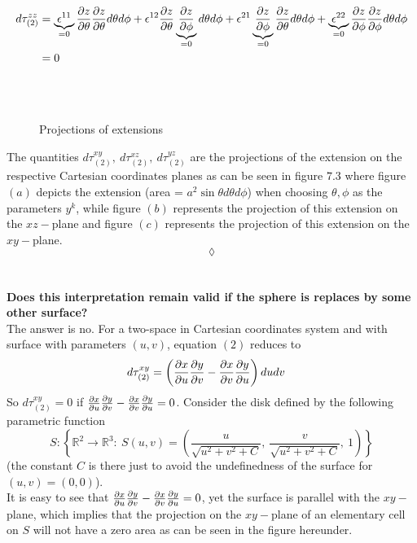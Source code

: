 \begin{align}
d\tau_{(2)}^{zz}&= \underbrace{\epsilon^{11}}_{=0}\pdv{z}{\theta}\pdv{z}{\theta}d{\theta}d{\phi}+\epsilon^{12}\pdv{z}{\theta}\underbrace{\pdv{z}{\phi}}_{=0}d{\theta}d{\phi}+\epsilon^{21}\underbrace{\pdv{z}{\phi}}_{=0}\pdv{z}{\theta}d{\theta}d{\phi}+\underbrace{\epsilon^{22}}_{=0}\pdv{z}{\phi}\pdv{z}{\phi}d{\theta}d{\phi}\\
&=0
\end{align}
\begin{figure}[H]%
    \centering
    \subfloat[]{}\\
    \subfloat[]{}\\
    \subfloat[]{}
\caption{Projections of extensions}
\label{fig:fig_p257}
\end{figure}
The quantities $d\tau_{(2)}^{xy},\ d\tau_{(2)}^{xz},  \ d\tau_{(2)}^{yz}$ are the projections of the extension on the respective Cartesian coordinates planes as can be seen in figure $7.3$ where figure $(a)$ depicts the extension (area = $a^2\sin{\theta}d\theta d\phi$) when choosing $\theta,\phi$ as the parameters $y^k$, while figure $(b)$ represents the projection of this extension on the $xz-$plane and figure $(c)$ represents the projection of this extension on the $xy-$plane.$$\lozenge$$ \\\\
\textbf{Does this interpretation remain valid if the sphere is replaces by some other surface?}
\\
The answer is no. For a two-space in Cartesian coordinates system  and with surface with parameters $(u,v)$, equation $(2)$ reduces to 
\begin{align}
d\tau_{(2)}^{xy}&= \left(\pdv{x}{u}\pdv{y}{v}-\pdv{x}{v}\pdv{y}{u}\right)dudv
\end{align}
So $d\tau_{(2)}^{xy}=0$ if $\pdv{x}{u}\pdv{y}{v}-\pdv{x}{v}\pdv{y}{u}=0$.
Consider the disk defined by the following parametric function
$$S: \left\{\mathbb{R}^2\rightarrow \mathbb{R}^3: \ S(u,v)= \left(\frac{u}{\sqrt{u^2+v^2+C}},\ \frac{v}{\sqrt{u^2+v^2+C}}, \ 1\right)\right\}$$ 
(the constant $C$ is there just to avoid the undefinedness of the surface for $(u,v) = (0,0)$). \\
It is easy to see that $\pdv{x}{u}\pdv{y}{v}-\pdv{x}{v}\pdv{y}{u}=0$, yet the surface is parallel with the $xy-$plane, which implies that the projection on the $xy-$plane of an elementary cell on $S$ will not have a zero area as can be seen in the figure hereunder. 


